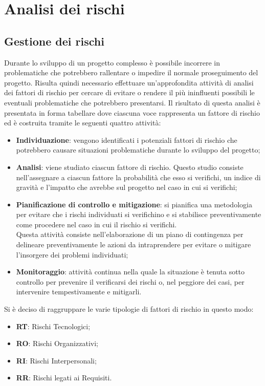 \section{Analisi dei rischi}
\subsection{Gestione dei rischi}
Durante lo sviluppo di un progetto complesso è possibile incorrere in problematiche che potrebbero rallentare o impedire il normale proseguimento del progetto. Risulta quindi necessario effettuare un'approfondita attività di analisi dei fattori di rischio per cercare di evitare o rendere il più ininfluenti possibili le eventuali problematiche che potrebbero presentarsi.
Il risultato di questa analisi è presentata in forma tabellare dove ciascuna voce rappresenta un fattore di rischio ed è costruita tramite le seguenti quattro attività:
\begin{itemize}
		\item \textbf{Individuazione}: vengono identificati i potenziali fattori di rischio che potrebbero causare situazioni problematiche durante lo sviluppo del progetto;
		\item \textbf{Analisi}: viene studiato ciascun fattore di rischio. Questo studio consiste nell'assegnare a ciascun fattore la probabilità che esso si verifichi, un indice di gravità e l'impatto che avrebbe sul progetto nel caso in cui si verifichi;
		\item \textbf{Pianificazione di controllo e mitigazione}: si pianifica una metodologia per evitare che i rischi individuati si verifichino e si stabilisce preventivamente come procedere nel caso in cui il rischio si verifichi. \\
		Questa attività consiste nell'elaborazione di un piano di contingenza per delineare preventivamente le azioni da intraprendere per evitare o mitigare l'insorgere dei problemi individuati;
		\item \textbf{Monitoraggio}: attività continua nella quale la situazione è tenuta sotto controllo per prevenire il verificarsi dei rischi o, nel peggiore dei casi, per intervenire tempestivamente e mitigarli. \\
\end{itemize}


Si è deciso di raggruppare le varie tipologie di fattori di rischio in questo modo:
\begin{itemize}
	\item \textbf{RT}: Rischi Tecnologici;
	\item \textbf{RO}: Rischi Organizzativi;
	\item \textbf{RI}: Rischi Interpersonali;
	\item \textbf{RR}: Rischi legati ai Requisiti.
\end{itemize}

